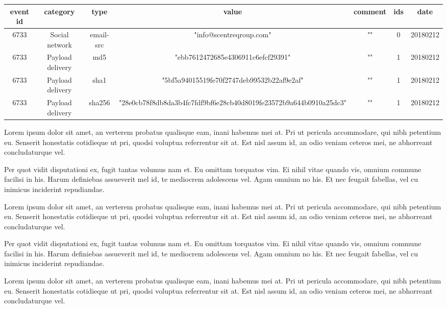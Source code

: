 \documentclass[11pt,fleqn]{book} %
\begin{document}
\begin{adjustbox}{angle=90}
\begin{tabular}{ || c | c | c | c | c | c | c ||}
  \hline \hline
  event id & category & type & value & comment & ids & date \\ \hline \hline
  6733 & Social network & email-src & "info@scentreqroup.com" & "" & 0 &20180212 \\ \hline
  6733 & Payload delivery & md5 & "ebb7612472685e4306911c6efcf29391" & "" & 1 & 20180212 \\ \hline
  6733 & Payload delivery & sha1 & "5bf5a94015519fe70f2747deb99532b22af9e2af" & "" & 1 & 20180212 \\ \hline
  6733 & Payload delivery & sha256 & "28e0cb78f8db8da3b4fc7fdf9bf6e28cb40d8019fe23572b9a644b0910a25dc3" & "" & 1 & 20180212 \\ \hline \hline
\end{tabular}
\end{adjustbox}


	Lorem ipsum dolor sit amet, an verterem probatus qualisque eam, inani habemus mei at. Pri ut pericula accommodare, qui nibh petentium eu. Senserit honestatis cotidieque ut pri, quodsi voluptua referrentur sit at. Est nisl assum id, an odio veniam ceteros mei, ne abhorreant concludaturque vel.

Per quot vidit disputationi ex, fugit tantas volumus nam et. Eu omittam torquatos vim. Ei nihil vitae quando vis, omnium commune facilisi in his. Harum definiebas assueverit mel id, te mediocrem adolescens vel. Agam omnium no his. Et nec feugait fabellas, vel cu inimicus inciderint repudiandae.

Lorem ipsum dolor sit amet, an verterem probatus qualisque eam, inani habemus mei at. Pri ut pericula accommodare, qui nibh petentium eu. Senserit honestatis cotidieque ut pri, quodsi voluptua referrentur sit at. Est nisl assum id, an odio veniam ceteros mei, ne abhorreant concludaturque vel.

Per quot vidit disputationi ex, fugit tantas volumus nam et. Eu omittam torquatos vim. Ei nihil vitae quando vis, omnium commune facilisi in his. Harum definiebas assueverit mel id, te mediocrem adolescens vel. Agam omnium no his. Et nec feugait fabellas, vel cu inimicus inciderint repudiandae.
    
  Lorem ipsum dolor sit amet, an verterem probatus qualisque eam, inani habemus mei at. Pri ut pericula accommodare, qui nibh petentium eu. Senserit honestatis cotidieque ut pri, quodsi voluptua referrentur sit at. Est nisl assum id, an odio veniam ceteros mei, ne abhorreant concludaturque vel.
\end{document}
